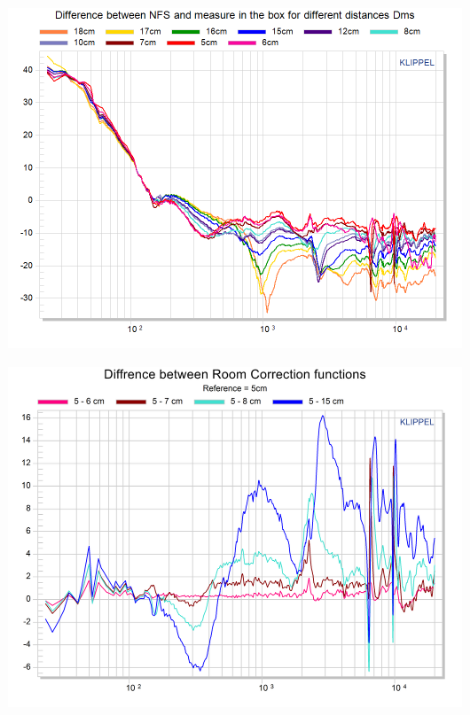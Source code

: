 \documentclass{report}
\begin{document}
\begin{minipage}{0.5\textwidth}
\begin{center}
	\includegraphics[width=0.9\textwidth]{RoomComp/MicPos_Diff_NFS_TRF} 
    \captionsetup{hypcap=false} 
	\label{fig:MicPosDiffNFS}
\end{center}
\end{minipage}
\begin{minipage}{0.5\textwidth}
\begin{center}
	\includegraphics[width=0.9\textwidth]{RoomComp/MicPos_Diff_RefMEas} 
    \captionsetup{hypcap=false} 
	\label{fig:MicPosDiffRC}
\end{center}
\end{minipage}
\end{document}

